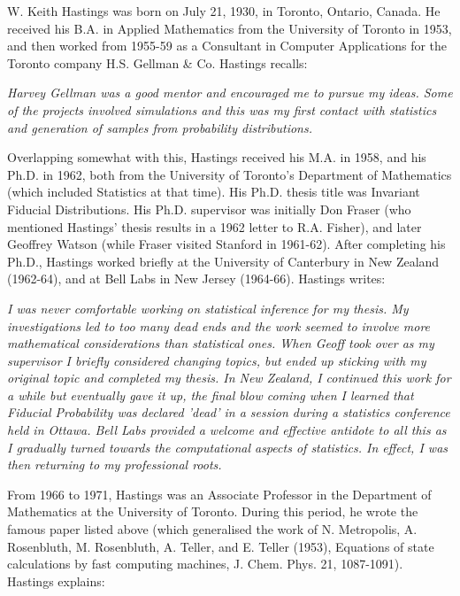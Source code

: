 \documentclass[english,graybox,envcountchap,envcountsame,sectrefs,shortlabels]{svmono}
\theoremstyle{style}
\begin{document}
\begin{subappendices}
W. Keith Hastings was born on July 21, 1930, in Toronto, Ontario,
Canada. He received his B.A. in Applied Mathematics from the University
of Toronto in 1953, and then worked from 1955-59 as a \textquotedbl Consultant
in Computer Applications\textquotedbl{} for the Toronto company H.S.
Gellman \& Co. Hastings recalls:

\emph{Harvey Gellman was a good mentor and encouraged me to pursue
my ideas. Some of the projects involved simulations and this was my
first contact with statistics and generation of samples from probability
distributions. }

Overlapping somewhat with this, Hastings received his M.A. in 1958,
and his Ph.D. in 1962, both from the University of Toronto's Department
of Mathematics (which included Statistics at that time). His Ph.D.
thesis title was \textquotedbl Invariant Fiducial Distributions\textquotedbl .
His Ph.D. supervisor was initially Don Fraser (who mentioned Hastings'
thesis results in a 1962 letter to R.A. Fisher), and later Geoffrey
Watson (while Fraser visited Stanford in 1961-62). After completing
his Ph.D., Hastings worked briefly at the University of Canterbury
in New Zealand (1962-64), and at Bell Labs in New Jersey (1964-66).
Hastings writes:

\emph{I was never comfortable working on statistical inference for
my thesis. My investigations led to too many dead ends and the work
seemed to involve more mathematical considerations than statistical
ones. When Geoff took over as my supervisor I briefly considered changing
topics, but ended up sticking with my original topic and completed
my thesis. In New Zealand, I continued this work for a while but eventually
gave it up, the final blow coming when I learned that Fiducial Probability
was declared 'dead' in a session during a statistics conference held
in Ottawa. Bell Labs provided a welcome and effective antidote to
all this as I gradually turned towards the computational aspects of
statistics. In effect, I was then returning to my professional roots. }

From 1966 to 1971, Hastings was an Associate Professor in the Department
of Mathematics at the University of Toronto. During this period, he
wrote the famous paper listed above (which generalised the work of
N. Metropolis, A. Rosenbluth, M. Rosenbluth, A. Teller, and E. Teller
(1953), \textquotedbl Equations of state calculations by fast computing
machines\textquotedbl , J. Chem. Phys. 21, 1087-1091). Hastings explains:


\end{subappendices}
\end{document}

